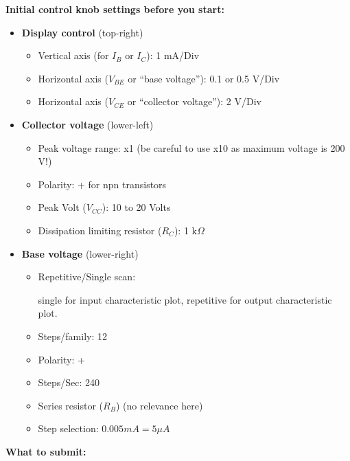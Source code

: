{\bf Initial control knob settings before you start:}
\begin{itemize}
\item {\bf Display control} (top-right)
  \begin{itemize}
  \item Vertical axis (for $I_B$ or $I_C$): 1 mA/Div
  \item Horizontal axis ($V_{BE}$ or ``base voltage''): 0.1 or 0.5 V/Div
  \item Horizontal axis ($V_{CE}$ or ``collector voltage''): 2 V/Div
  \end{itemize}
\item {\bf Collector voltage} (lower-left)
  \begin{itemize}
  \item Peak voltage range: x1 (be careful to use x10 as maximum voltage is 200 V!)
  \item Polarity: + for npn transistors
  \item Peak Volt ($V_{CC}$): 10 to 20 Volts
  \item Dissipation limiting resistor ($R_C$): 1 k$\Omega$
  \end{itemize}
\item {\bf Base voltage} (lower-right)
  \begin{itemize}
  \item Repetitive/Single scan: 

    single for input characteristic plot, repetitive for output characteristic plot.
  \item Steps/family: 12
  \item Polarity: +
  \item Steps/Sec: 240
  \item Series resistor ($R_B$) (no relevance here)
  \item Step selection: $0.005 mA = 5 \mu A$
  \end{itemize}
\end{itemize}

{\bf What to submit:}

